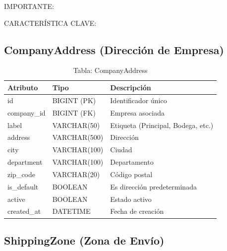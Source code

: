 \documentclass[12pt,a4paper,oneside]{book}
\begin{document}
\begin{alert}{IMPORTANTE:}
\begin{info}{CARACTERÍSTICA CLAVE:}
\subsection{CompanyAddress (Dirección de Empresa)}
\label{sec:companyaddress}

\begin{table}[ht]
    \centering
    \caption{Tabla: CompanyAddress}
    \begin{tabular}{@{}lll@{}}
        \toprule
        \textbf{Atributo} & \textbf{Tipo} & \textbf{Descripción} \\
        \midrule
        id & BIGINT (PK) & Identificador único \\
        company\_id & BIGINT (FK) & Empresa asociada \\
        label & VARCHAR(50) & Etiqueta (Principal, Bodega, etc.) \\
        address & VARCHAR(500) & Dirección \\
        city & VARCHAR(100) & Ciudad \\
        department & VARCHAR(100) & Departamento \\
        zip\_code & VARCHAR(20) & Código postal \\
        is\_default & BOOLEAN & Es dirección predeterminada \\
        active & BOOLEAN & Estado activo \\
        created\_at & DATETIME & Fecha de creación \\
        \bottomrule
    \end{tabular}
\end{table}

\subsection{ShippingZone (Zona de Envío)}
\label{sec:shippingzone}


\end{info}
\end{alert}
\end{document}
